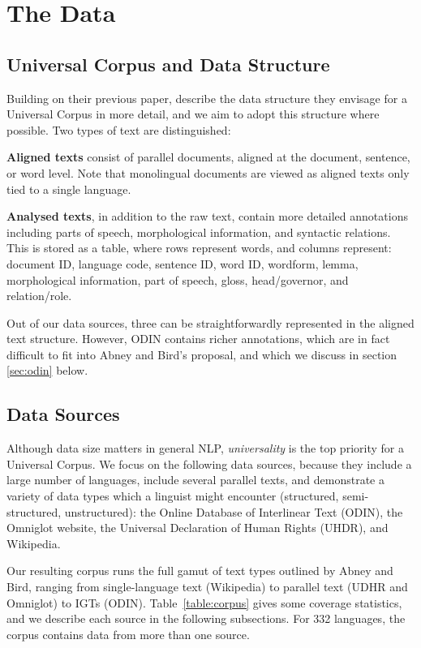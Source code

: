 \section{The Data}\label{sec:data}



\subsection{Universal Corpus and Data Structure} \label{sec:structure}

Building on their previous paper,  describe the data structure they envisage for a Universal Corpus in more detail, and we aim to adopt this structure where possible.  Two types of text are distinguished:

\textbf{Aligned texts} consist of parallel documents, aligned at the document, sentence, or word level. Note that monolingual documents are viewed as aligned texts only tied to a single language.

\textbf{Analysed texts}, in addition to the raw text, contain more detailed annotations including parts of speech, morphological information, and syntactic relations.  This is stored as a table, where rows represent words, and columns represent: document ID, language code, sentence ID, word ID, wordform, lemma, morphological information, part of speech, gloss, head/governor, and relation/role.

Out of our data sources, three can be straightforwardly represented in the aligned text structure. However, ODIN contains richer annotations, which are in fact difficult to fit into Abney and Bird's proposal, and which we discuss in section \ref{sec:odin} below.


\subsection{Data Sources} \label{sec:sources}

Although data size matters in general NLP, \emph{universality} is the top priority for a Universal Corpus. We focus on the following data sources, because they include a large number of languages, include several parallel texts, and demonstrate a variety of data types which a linguist might encounter (structured, semi-structured, unstructured): the Online Database of Interlinear Text (ODIN), the Omniglot website, the Universal Declaration of Human Rights (UHDR), and Wikipedia.

Our resulting corpus runs the full gamut of text types outlined by Abney and Bird, ranging from single-language text (Wikipedia) to parallel text (UDHR and Omniglot) to IGTs (ODIN). Table~\ref{table:corpus} gives some coverage statistics, and we describe each source in the following subsections.  For 332 languages, the corpus contains data from more than one source.


